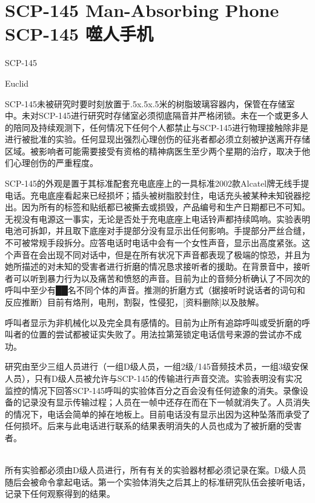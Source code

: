 \chapter[SCP-145 噬人手机]{
    SCP-145 Man-Absorbing Phone\\
    SCP-145 噬人手机
}

\label{chap:SCP-145}

SCP-145

Euclid

SCP-145未被研究时要时刻放置于.5x.5x.5米的树脂玻璃容器内，保管在存储室中。未对SCP-145进行研究时存储室必须彻底隔音并严格闭锁。未在一个或更多人的陪同及持续观测下，任何情况下任何个人都禁止与SCP-145进行物理接触除非是进行被批准的实验。任何显现出强烈心理创伤的征兆者都必须立刻被护送离开存储区域。被影响者可能需要接受有资格的精神病医生至少两个星期的治疗，取决于他们心理创伤的严重程度。

SCP-145的外观是置于其标准配套充电底座上的一具标准2002款Alcatel牌无线手提电话。充电底座看起来已经损坏；插头被树脂胶封住，电话充头被某种未知锐器挖出。因为所有的标签和贴纸都已被撕去或损毁，产品编号和生产日期都已不可知。无视没有电源这一事实，无论是否处于充电底座上电话铃声都持续鸣响。实验表明电池可拆卸，并且取下底座对手提部分没有显示出任何影响。手提部分严丝合缝，不可被常规手段拆分。应答电话时电话中会有一个女性声音，显示出高度紧张。这个声音在会出现不同对话中，但是在所有状况下声音都表现了极端的惊恐，并且为她所描述的对未知的受害者进行折磨的情况恳求接听者的援助。在背景音中，接听者可以听到暴力行为以及痛苦和愤怒的声音。目前为止的音频分析确认了不同次的呼叫中至少有██名不同个体的声音。推测的折磨方式（据接听时说话者的词句和反应推断）目前有烙刑，电刑，割裂，性侵犯，{[}资料删除]以及肢解。

呼叫者显示为非机械化以及完全具有感情的。目前为止所有追踪呼叫或受折磨的呼叫者的位置的尝试都被证实失败了。用法拉第笼锁定电话信号来源的尝试亦不成功。

研究由至少三组人员进行（一组D级人员，一组2级\slash 145音频技术员，一组3级安保人员），只有D级人员被允许与SCP-145的传输进行声音交流。实验表明没有实况监控的情况下回答SCP-145呼叫的实验体百分之百会没有任何迹象的消失。录像设备的记录没有显示传输过程；人员在一帧中还存在而在下一帧就消失了。人员消失的情况下，电话会简单的掉在地板上。目前电话没有显示出因为这种坠落而承受了任何损坏。后来与此电话进行联系的结果表明消失的人员也成为了被折磨的受害者。

\\
所有实验都必须由D级人员进行，所有有关的实验器材都必须记录在案。D级人员随后会被命令拿起电话。第一个实验体消失之后其上的标准研究队伍会接听电话，记录下任何观察得到的结果。

